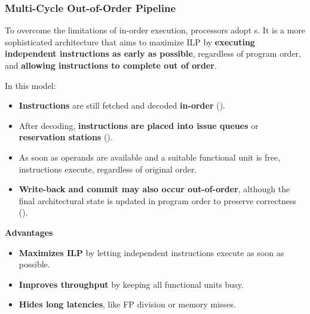 \subsubsection{Multi-Cycle Out-of-Order Pipeline}

To overcome the limitations of in-order execution, processors adopt s. It is a more sophisticated architecture that aims to maximize ILP by \textbf{executing independent instructions as early as possible}, regardless of program order, and \textbf{allowing instructions to complete out of order}.

\highspace
In this model:
\begin{itemize}
    \item \textbf{Instructions} are still fetched and decoded \textbf{in-order} ().
    \item After decoding, \textbf{instructions are placed into issue queues} or \textbf{reservation stations} ().
    \item As soon as operands are available and a suitable functional unit is free, instructions execute, regardless of original order.
    \item \textbf{Write-back and commit may also occur out-of-order}, although the final architectural state is updated in program order to preserve correctness ().
\end{itemize}

\highspace
\begin{flushleft}
    \textcolor{Green3}{ \textbf{Advantages}}
\end{flushleft}
\begin{itemize}[label=\textcolor{Green3}{}]
    \item \textbf{Maximizes ILP} by letting independent instructions execute as soon as possible.
    \item \textbf{Improves throughput} by keeping all functional units busy.
    \item \textbf{Hides long latencies}, like FP division or memory misses.
\end{itemize}

